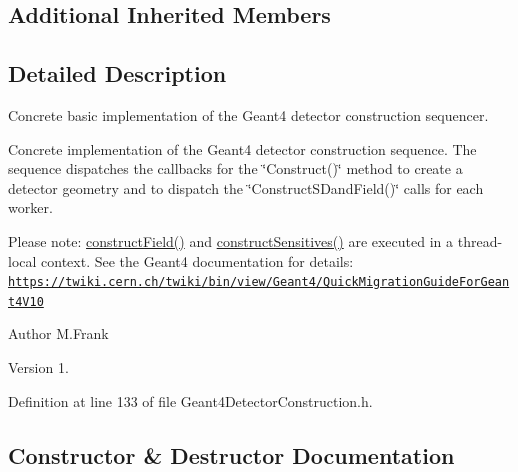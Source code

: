 \subsection*{Additional Inherited Members}


\subsection{Detailed Description}
Concrete basic implementation of the Geant4 detector construction sequencer. 

Concrete implementation of the Geant4 detector construction sequence. The sequence dispatches the callbacks for the \char`\"{}\+Construct()\char`\"{} method to create a detector geometry and to dispatch the \char`\"{}\+Construct\+S\+Dand\+Field()\char`\"{} calls for each worker.

Please note\+: \hyperlink{class_d_d4hep_1_1_simulation_1_1_geant4_detector_construction_sequence_a74d488648a50cae0230ca9dedf678160}{construct\+Field()} and \hyperlink{class_d_d4hep_1_1_simulation_1_1_geant4_detector_construction_sequence_ab242c91f95283ed32133f48f2bc573fa}{construct\+Sensitives()} are executed in a thread-\/local context. See the Geant4 documentation for details\+: \href{https://twiki.cern.ch/twiki/bin/view/Geant4/QuickMigrationGuideForGeant4V10}{\tt https\+://twiki.\+cern.\+ch/twiki/bin/view/\+Geant4/\+Quick\+Migration\+Guide\+For\+Geant4\+V10}

\begin{DoxyAuthor}{Author}
M.\+Frank 
\end{DoxyAuthor}
\begin{DoxyVersion}{Version}
1. 
\end{DoxyVersion}


Definition at line 133 of file Geant4\+Detector\+Construction.\+h.



\subsection{Constructor \& Destructor Documentation}
\hypertarget{class_d_d4hep_1_1_simulation_1_1_geant4_detector_construction_sequence_abd65d829a42c5d6e403349c9ffbb13d1}{}\label{class_d_d4hep_1_1_simulation_1_1_geant4_detector_construction_sequence_abd65d829a42c5d6e403349c9ffbb13d1} 
